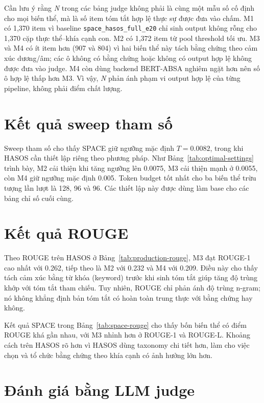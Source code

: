 \documentclass[12pt,a4paper]{report}
\begin{document}
Cần lưu ý rằng \textit{N} trong các bảng judge không phải là cùng một mẫu số cố định cho mọi biến thể, mà là số item tóm tắt hợp lệ thực sự được đưa vào chấm. M1 có 1,370 item vì baseline \texttt{space\_hasos\_full\_e20} chỉ sinh output không rỗng cho 1,370 cặp thực thể--khía cạnh con. M2 có 1,372 item từ pool threshold tối ưu. M3 và M4 có ít item hơn (907 và 804) vì hai biến thể này tách bằng chứng theo cảm xúc dương/âm; các ô không có bằng chứng hoặc không có output hợp lệ không được đưa vào judge. M4 còn dùng backend BERT-ABSA nghiêm ngặt hơn nên số ô hợp lệ thấp hơn M3. Vì vậy, \textit{N} phản ánh phạm vi output hợp lệ của từng pipeline, không phải điểm chất lượng.


\FloatBarrier

\section{Kết quả sweep tham số}

Sweep tham số cho thấy SPACE giữ ngưỡng mặc định \(T=0.0082\), trong khi HASOS cần thiết lập riêng theo phương pháp. Như Bảng~\ref{tab:optimal-settings} trình bày, M2 cải thiện khi tăng ngưỡng lên 0.0075, M3 cải thiện mạnh ở 0.0055, còn M4 giữ ngưỡng mặc định 0.005. Token budget tốt nhất cho ba biến thể trừu tượng lần lượt là 128, 96 và 96. Các thiết lập này được dùng làm base cho các bảng chỉ số cuối cùng.

\section{Kết quả ROUGE}

Theo ROUGE trên HASOS ở Bảng~\ref{tab:production-rouge}, M3 đạt ROUGE-1 cao nhất với 0.262, tiếp theo là M2 với 0.232 và M4 với 0.209. Điều này cho thấy tách cảm xúc bằng từ khóa (keyword) trước khi sinh tóm tắt giúp tăng độ trùng khớp với tóm tắt tham chiếu. Tuy nhiên, ROUGE chỉ phản ánh độ trùng n-gram; nó không khẳng định bản tóm tắt có hoàn toàn trung thực với bằng chứng hay không.

Kết quả SPACE trong Bảng~\ref{tab:space-rouge} cho thấy bốn biến thể có điểm ROUGE khá gần nhau, với M3 nhỉnh hơn ở ROUGE-1 và ROUGE-L. Khoảng cách trên HASOS rõ hơn vì HASOS dùng taxonomy chi tiết hơn, làm cho việc chọn và tổ chức bằng chứng theo khía cạnh có ảnh hưởng lớn hơn.

\section{Đánh giá bằng LLM judge}
\end{document}
